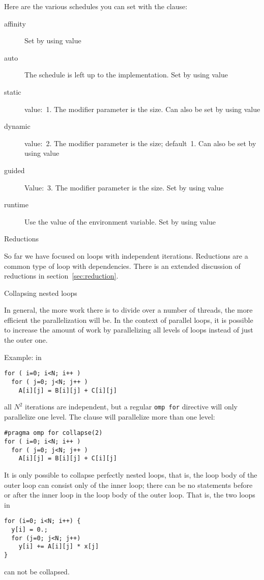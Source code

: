 Here are the various schedules you can set with the
 clause:
\begin{description}
  \item[affinity] Set by using value  
  \item[auto] The schedule is left up to the implementation. Set by
    using value 
  \item[static] value:~1. The modifier parameter is the  size.
    Can also be set by using value  
  \item[dynamic] value:~2. The modifier parameter is the
     size; default~1.
    Can also be set by using value
  \item[guided] Value:~3. The modifier parameter is the
     size. Set by using value
  \item[runtime] Use the value of the 
    environment variable. Set by using value
\end{description}

 {Reductions}

So far we have focused on loops with independent iterations.
Reductions are a common type of loop with dependencies.
There is an extended discussion of reductions in section~\ref{sec:reduction}.

 {Collapsing nested loops}

In general, the more work there is to divide over a number of threads,
the more efficient the parallelization will be. In the context of
parallel loops, it is possible to increase the amount of work by
parallelizing all levels of loops instead of just the outer one.

Example: in
\begin{lstlisting}
for ( i=0; i<N; i++ )
  for ( j=0; j<N; j++ )
    A[i][j] = B[i][j] + C[i][j] 
\end{lstlisting}
all $N^2$ iterations are independent, but a regular \lstinline{omp for}
directive will only parallelize one level. The 
clause will parallelize more than one level:
\begin{lstlisting}
#pragma omp for collapse(2)
for ( i=0; i<N; i++ )
  for ( j=0; j<N; j++ )
    A[i][j] = B[i][j] + C[i][j] 
\end{lstlisting}
It is only possible to collapse perfectly nested loops, that is, the
loop body of the outer loop can consist only of the inner loop; there
can be no statements before or after the inner loop in the loop body
of the outer loop. That is, the two loops in
\begin{lstlisting}
for (i=0; i<N; i++) {
  y[i] = 0.;
  for (j=0; j<N; j++)
    y[i] += A[i][j] * x[j]
}
\end{lstlisting}
can not be collapsed.

